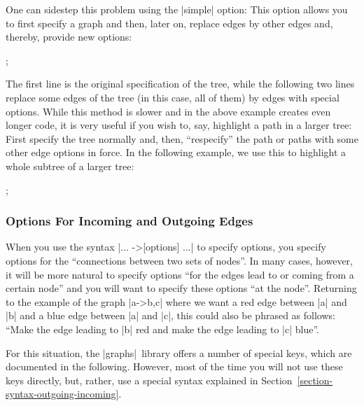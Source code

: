 One can sidestep this problem using the |simple| option: This option allows you
to first specify a graph and then, later on, replace edges by other edges and,
thereby, provide new options:
%
\begin{codeexample}[preamble={\usetikzlibrary{graphs}}]
\tikz {};
\end{codeexample}

The first line is the original specification of the tree, while the following
two lines replace some edges of the tree (in this case, all of them) by edges
with special options. While this method is slower and in the above example
creates even longer code, it is very useful if you wish to, say, highlight a
path in a larger tree: First specify the tree normally and, then, ``respecify''
the path or paths with some other edge options in force. In the following
example, we use this to highlight a whole subtree of a larger tree:
\begin{codeexample}[preamble={\usetikzlibrary{graphs}}]
\tikz {};
\end{codeexample}


\subsubsection{Options For Incoming and Outgoing Edges}

When you use the syntax |... ->[options] ...| to specify options, you specify
options for the ``connections between two sets of nodes''. In many cases,
however, it will be more natural to specify options ``for the edges lead to or
coming from a certain node'' and you will want to specify these options ``at
the node''. Returning to the example of the graph |a->{b,c}| where we want a
red edge between |a| and |b| and a blue edge between |a| and |c|, this could
also be phrased as follows: ``Make the edge leading to |b| red and make the
edge leading to |c| blue''.

For this situation, the |graphs| library offers a number of special keys, which
are documented in the following. However, most of the time you will not use
these keys directly, but, rather, use a special syntax explained in
Section~\ref{section-syntax-outgoing-incoming}.

